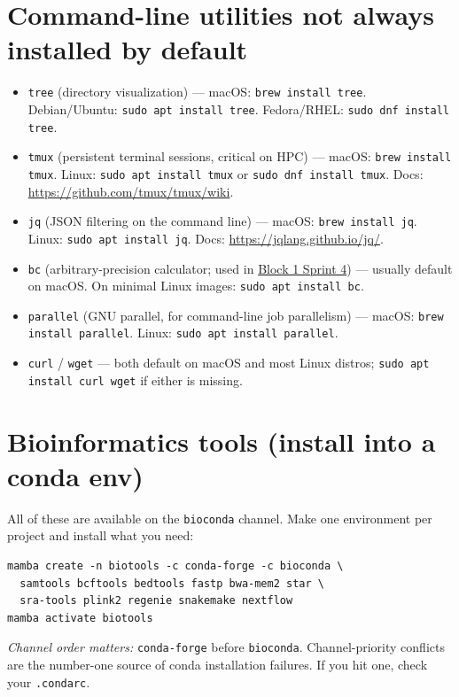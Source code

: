 \section{Command-line utilities not always installed by default}

\begin{itemize}[nosep]
  \item \texttt{tree} (directory visualization) --- macOS: \texttt{brew install tree}. Debian/Ubuntu: \texttt{sudo apt install tree}. Fedora/RHEL: \texttt{sudo dnf install tree}.
  \item \texttt{tmux} (persistent terminal sessions, critical on HPC) --- macOS: \texttt{brew install tmux}. Linux: \texttt{sudo apt install tmux} or \texttt{sudo dnf install tmux}. Docs: \url{https://github.com/tmux/tmux/wiki}.
  \item \texttt{jq} (JSON filtering on the command line) --- macOS: \texttt{brew install jq}. Linux: \texttt{sudo apt install jq}. Docs: \url{https://jqlang.github.io/jq/}.
  \item \texttt{bc} (arbitrary-precision calculator; used in \hyperref[chap:unix]{Block 1 Sprint 4}) --- usually default on macOS. On minimal Linux images: \texttt{sudo apt install bc}.
  \item \texttt{parallel} (GNU parallel, for command-line job parallelism) --- macOS: \texttt{brew install parallel}. Linux: \texttt{sudo apt install parallel}.
  \item \texttt{curl} / \texttt{wget} --- both default on macOS and most Linux distros; \texttt{sudo apt install curl wget} if either is missing.
\end{itemize}


\section{Bioinformatics tools (install into a conda env)}

All of these are available on the \texttt{bioconda} channel. Make one environment per project and install what you need:

\begin{lstlisting}
mamba create -n biotools -c conda-forge -c bioconda \
  samtools bcftools bedtools fastp bwa-mem2 star \
  sra-tools plink2 regenie snakemake nextflow
mamba activate biotools
\end{lstlisting}

\textit{Channel order matters:} \texttt{conda-forge} before \texttt{bioconda}. Channel-priority conflicts are the number-one source of conda installation failures. If you hit one, check your \texttt{.condarc}.

